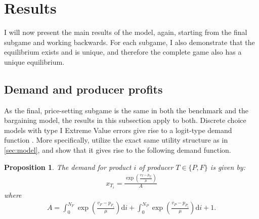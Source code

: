 \documentclass[a4paper]{article}
\newtheorem{proposition}{Proposition}
\newcommand{\di}{\mathrm{d}i}
\begin{document}




\section{Results}

I will now present the main results of the model, again, starting from the final subgame and working backwards.
For each subgame, I also demonstrate that the equilibrium exists and is unique, and therefore the complete game also has a unique equilibrium.

\subsection{Demand and producer profits}

As the final, price-setting subgame is the same in both the benchmark and the bargaining model, the results in this subsection apply to both.
Discrete choice models with type I Extreme Value errors give rise to a logit-type demand function \parencite[e.g.][]{small1981applied}.
More specifically, \textcite[]{anderson2021hybrid} utilize the exact same utility structure as in \cref{sec:model}, and show that it gives rise to the following demand function.
\begin{proposition}
    \label{prop:demand_function}
    The demand for product $i$ of producer $T \in \{P, F\}$ is given by:
    \begin{align*}
        x_{T_i} = \frac{\exp\left( \frac{v_T - p_{T_i}}{\mu} \right)}{A}
    \end{align*}
    where
    \begin{align}
        A = \int_0^{N_F} \exp\left( \frac{v_F - p_{F_i}}{\mu} \right) \di + \int_0^{N_P} \exp\left( \frac{v_P - p_{P_i}}{\mu} \right) \di + 1.
        \label{eq:aggregate}
    \end{align}
\end{proposition}
\end{document}
